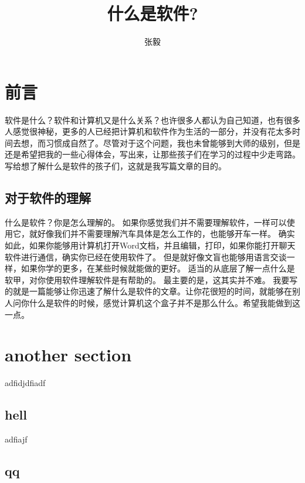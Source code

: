\documentclass{article}
\title{什么是软件?}
\author{张毅}
\begin{document}
\maketitle
\tableofcontents
\newpage
\section{前言}
软件是什么？软件和计算机又是什么关系？也许很多人都认为自己知道，也有很多人感觉很神秘，更多的人已经把计算机和软件作为生活的一部分，并没有花太多时间去想，而习惯成自然了。尽管对于这个问题，我也未曾能够到大师的级别，但是还是希望把我的一些心得体会，写出来，让那些孩子们在学习的过程中少走弯路。写给想了解什么是软件的孩子们，这就是我写篇文章的目的。
\subsection{对于软件的理解}
什么是软件？你是怎么理解的。
如果你感觉我们并不需要理解软件，一样可以使用它，就好像我们并不需要理解汽车具体是怎么工作的，也能够开车一样。
确实如此，如果你能够用计算机打开Word文档，并且编辑，打印，如果你能打开聊天软件进行通信，确实你已经在使用软件了。
但是就好像文盲也能够用语言交谈一样，如果你学的更多，在某些时候就能做的更好。
适当的从底层了解一点什么是软甲，对你使用软件理解软件是有帮助的。
最主要的是，这其实并不难。
我要写的就是一篇能够让你迅速了解什么是软件的文章。让你花很短的时间，就能够在别人问你什么是软件的时候，感觉计算机这个盒子并不是那么什么。希望我能做到这一点。
\section{another section}
adfidjdfiadf
\subsection{hell}
adfiajf
\subsection{qq}
\end{document}
